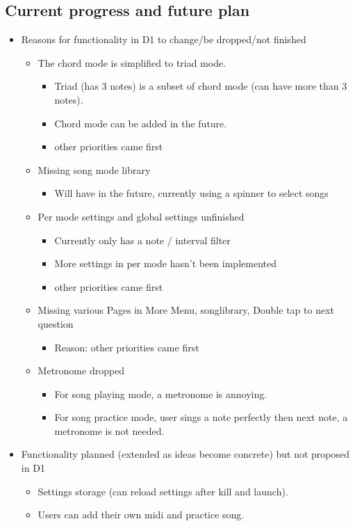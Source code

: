 \documentclass{article}
\begin{document}
\subsection{Current progress and future plan}
\begin{itemize}
  \item 
 Reasons for functionality in D1 to change/be dropped/not finished 
\begin{itemize}
  \item The chord mode is simplified to triad mode. 
    \begin{itemize}
      \item 
        Triad (has 3 notes) is a subset of chord mode (can have more than 3 notes). 
      \item 
        Chord mode can be added in the future. 
      \item 
        other priorities came first
    \end{itemize}
  \item 
    Missing song mode library
    \begin{itemize}
      \item 
        Will have in the future, currently using a spinner to select songs
    \end{itemize}
  \item 
    Per mode settings and global settings unfinished 
    \begin{itemize}
      \item 
        Currently only has a note / interval filter 
      \item 
        More settings in per mode hasn’t been implemented 
      \item 
        other priorities came first
    \end{itemize}
  \item
    Missing various Pages in More Menu, songlibrary, Double tap to next question
    \begin{itemize}
      \item 
        Reason: other priorities came first
    \end{itemize}
  \item
    Metronome dropped
    \begin{itemize}
      \item 
        For song playing mode, a metronome is annoying.
      \item 
        For song practice mode, user sings a note perfectly then next note, a metronome is not needed.
    \end{itemize}
\end{itemize}
\item{ Functionality planned (extended as ideas become concrete) but not proposed in D1 }

\begin{itemize}
  \item 
    Settings storage (can reload settings after kill and launch).
  \item
    Users can add their own midi and practice song.
\end{itemize}
\end{itemize}
\end{document}
